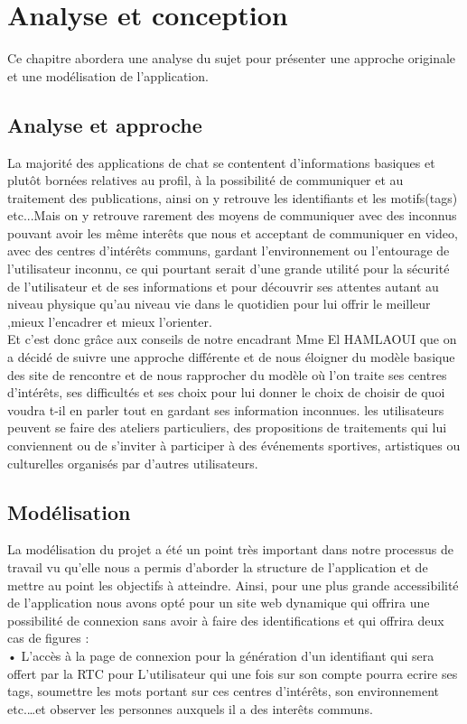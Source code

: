 \documentclass[oneside,12pt,a4paper]{book}
\begin{document}
\chapter{Analyse et conception}
Ce chapitre abordera une analyse du sujet pour présenter une approche
originale et une modélisation de l’application.



\section{	Analyse et approche}
La majorité des applications de chat se contentent d’informations basiques et plutôt bornées relatives au profil, à la possibilité de communiquer et au traitement des publications, ainsi on y retrouve les identifiants et les motifs(tags) etc...Mais on y retrouve rarement des moyens de communiquer avec des inconnus pouvant avoir les même interêts que nous et acceptant de communiquer en video, avec des centres d’intérêts communs, gardant l’environnement ou l’entourage de l'utilisateur inconnu, ce qui pourtant serait d’une grande utilité pour la sécurité de l'utilisateur et de ses informations et pour découvrir ses attentes autant au niveau physique qu’au niveau vie dans le quotidien pour lui offrir le meilleur ,mieux l’encadrer et mieux l’orienter.\\
Et c’est donc grâce aux conseils de notre encadrant Mme El HAMLAOUI que on a décidé de suivre une approche différente et de nous éloigner du modèle basique des site de rencontre et de nous rapprocher du modèle où l’on traite ses centres d’intérêts, ses difficultés et ses choix pour lui donner le choix de choisir de quoi voudra t-il en parler tout en gardant ses information inconnues. les utilisateurs peuvent se faire des ateliers particuliers, des propositions de traitements qui lui conviennent ou de s'inviter à participer à des événements sportives, artistiques ou culturelles organisés par d'autres utilisateurs.

\section{Modélisation}
 La modélisation du projet a été un point très important dans notre processus de travail vu qu’elle nous a permis d’aborder la structure de l’application et de mettre au point les objectifs à atteindre. Ainsi, pour une plus grande accessibilité de l’application nous avons opté pour un site web dynamique qui offrira une possibilité de connexion sans avoir à faire des identifications et qui offrira deux cas de figures :\\
•	L'accès à la page de connexion pour la génération d'un identifiant qui sera offert par la RTC pour
L'utilisateur qui une fois sur son compte pourra ecrire ses tags, soumettre les mots portant sur ces centres d’intérêts, son environnement etc.…et observer les personnes auxquels il a des interêts communs. 
\end{document}
